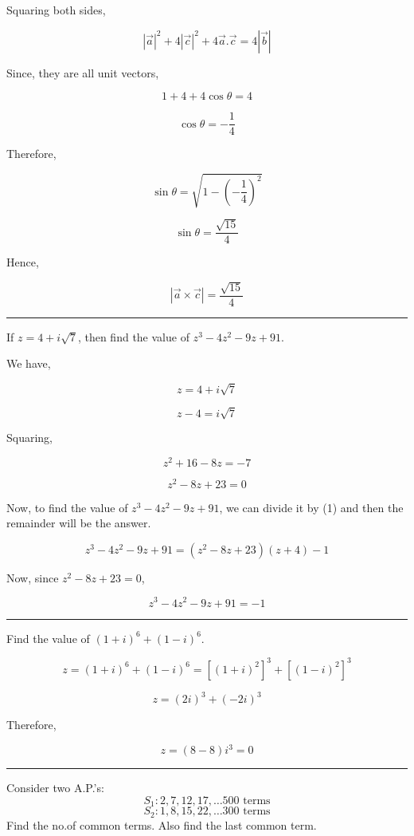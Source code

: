 \documentclass[twocolumn]{article}
\begin{document}
\begin{CJK*}{UTF8}{gbsn}
Squaring both sides,

\[
    |\vec{a}|^{2} + 4|\vec{c}|^{2} + 4\vec{a}.\vec{c} = 4|\vec{b} |
\]

Since, they are all unit vectors, 

\[
    1 + 4 + 4\cos \theta = 4
\]

\[
    \cos \theta = -\frac{1}{4}
\]

Therefore, 

\[
    \sin \theta = \sqrt{1 - (-\frac{1}{4})^{2} } 
\]

\[
    \sin \theta = \frac{\sqrt{15}}{4} 
\]

Hence, 

\[
    \boxed{|\vec{a}\times \vec{c}| = \frac{\sqrt{15}}{4} }
\]

\hrule 

\begin{question}
    If \(z = 4 + i \sqrt{7} \), then find the value of \(z^3 - 4z^2 - 9z + 91\).   
\end{question}

We have, 

\[
    z = 4 + i \sqrt{7} 
\]

\[
    z-4 = i\sqrt{7} 
\]

Squaring, 

\[
    z^{2} + 16 - 8z = -7
\]

\[
    z^{2} -8z + 23 = 0 \tag{1}
\]

Now, to find the value of \(z^3 - 4z^{2} - 9z + 91\), we can divide it by (1) and then the remainder will be the answer. 

\[
    z^3 - 4z^{2}  - 9z + 91 = (z^{2}  - 8z + 23)(z + 4) - 1
\]

Now, since \(z^{2} - 8z + 23 = 0\), 

\[
    \boxed{z^3 - 4z^{2}  - 9z + 91 = -1}
\]

\hrule

\begin{question}
    Find the value of \((1+i)^6 + (1-i)^6\).
\end{question}

\[
    z = (1+ i)^6 + (1 - i)^6 = [(1+i)^2]^3 + [(1- i)^2]^3
\]

\[
    z = (2i)^3 + (-2i)^3
\]

Therefore, 

\[
    \boxed{z = (8-8)i^3 = 0}
\]

\hrule

\begin{question}
    Consider two A.P.'s: 
    \[
        S_1 : 2, 7, 12, 17, \dots 500 \text{ terms}
    \] 
    \[
        S_2 : 1, 8, 15, 22, \dots 300 \text{ terms}
    \]
    Find the no.of common terms. Also find the last common term. 
\end{question}


\end{CJK*}
\end{document}

